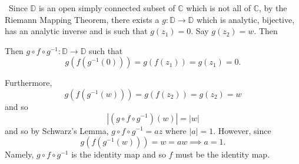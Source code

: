 \documentclass[12pt]{Homework}
\begin{document}
\begin{solution}$\,$
Since $\mathbb{D}$ is an open simply connected subset of $\mathbb{C}$ which is not all of $\mathbb{C}$, by the Riemann Mapping Theorem, there exists a $g:\mathbb{D}\to\mathbb{D}$ which is analytic, bijective, has an analytic inverse and is such that $g(z_1)=0$. Say $g(z_2)=w$. Then

Then $g\circ f\circ g^{-1}:\mathbb{D}\to\mathbb{D}$ such that $$g(f(g^{-1}(0)))=g(f(z_1))=g(z_1)=0.$$

Furthermore, $$g(f(g^{-1}(w)))=g(f(z_2))=g(z_2)=w$$ and so $$|(g\circ f\circ g^{-1})(w)|=|w|$$ and so by Schwarz's Lemma, $g\circ f\circ g^{-1}=az$ where $|a|=1$. However, since $$g(f(g^{-1}(w)))=w=aw\implies a=1.$$ Namely, $g\circ f\circ g^{-1}$ is the identity map and so $f$ must be the identity map. 
\end{solution}
\end{document}
